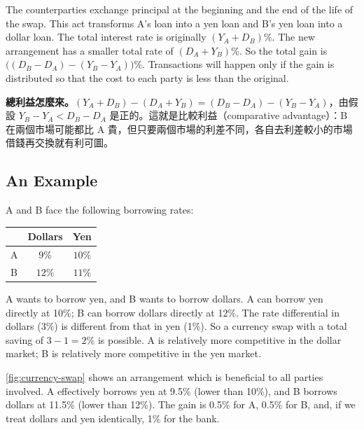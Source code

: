 The counterparties exchange principal at the beginning and the end of the life of the swap.
This act transforms A's loan into a yen loan and B's yen loan into a dollar loan.
The total interest rate is originally $(Y_{A}+D_{B})\%$.
The new arrangement has a smaller total rate of $(D_{A}+Y_{B})\%$.
So the total gain is $\bigl((D_{B}-D_{A})-(Y_{B}-Y_{A})\bigr)\%$.
Transactions will happen only if the gain is distributed so that the cost to each party is less than the original.

\suppstart
{}

\begin{remark}
	\textbf{總利益怎麼來。}$(Y_{A}+D_{B})-(D_{A}+Y_{B})=(D_{B}-D_{A})-(Y_{B}-Y_{A})$，由假設 $Y_{B}-Y_{A}<D_{B}-D_{A}$ 是正的。這就是比較利益（comparative advantage）：B 在兩個市場可能都比 A 貴，但只要兩個市場的利差不同，各自去利差較小的市場借錢再交換就有利可圖。
\end{remark}
\suppend

\subsection{An Example}
\label{sec:swap-example}


A and B face the following borrowing rates:
\begin{center}
	\begin{tabular}{lcc}
		\toprule
		  & Dollars & Yen    \\
		\midrule
		A & $9\%$   & $10\%$ \\
		B & $12\%$  & $11\%$ \\
		\bottomrule
	\end{tabular}
\end{center}
A wants to borrow yen, and B wants to borrow dollars.
A can borrow yen directly at 10\%; B can borrow dollars directly at 12\%.
The rate differential in dollars (3\%) is different from that in yen (1\%).
So a currency swap with a total saving of $3-1=2\%$ is possible.
A is relatively more competitive in the dollar market; B is relatively more competitive in the yen market.

\autoref{fig:currency-swap} shows an arrangement which is beneficial to all parties involved.
A effectively borrows yen at 9.5\% (lower than 10\%), and B borrows dollars at 11.5\% (lower than 12\%).
The gain is 0.5\% for A, 0.5\% for B, and, if we treat dollars and yen identically, 1\% for the bank.


